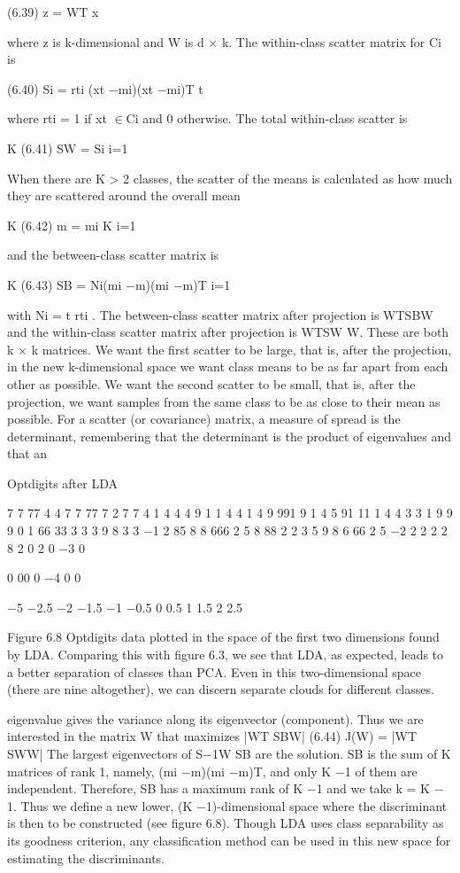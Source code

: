 (6.39) z = WT x

where z is k-dimensional and W is d $\times$ k. The within-class scatter matrix for Ci is

(6.40) Si = rti (xt $-$mi)(xt $-$mi)T t

where rti = 1 if xt $\in$Ci and 0 otherwise. The total within-class scatter is

K (6.41) SW = Si i=1

When there are K > 2 classes, the scatter of the means is calculated as how much they are scattered around the overall mean

K (6.42) m = mi K i=1

and the between-class scatter matrix is

K (6.43) SB = Ni(mi $-$m)(mi $-$m)T i=1

with Ni = t rti . The between-class scatter matrix after projection is WTSBW and the within-class scatter matrix after projection is WTSW W. These are both k $\times$ k matrices. We want the first scatter to be large, that is, after the projection, in the new k-dimensional space we want class means to be as far apart from each other as possible. We want the second scatter to be small, that is, after the projection, we want samples from the same class to be as close to their mean as possible. For a scatter (or covariance) matrix, a measure of spread is the determinant, remembering that the determinant is the product of eigenvalues and that an

Optdigits after LDA

7 7 77 4 4 7 7 77 7 2 7 7 4 1 4 4 4 9 1 1 4 4 1 4 9 991 9 1 4 5 91 11 1 4 4 3 3 1 9 9 9 0 1 66 33 3 3 3 9 8 3 3 $-$1 2 85 8 8 666 2 5 8 88 2 2 3 5 9 8 6 66 2 5 $-$2 2 2 2 2 8 2 0 2 0 $-$3 0

0 00 0 $-$4 0 0

$-$5 $-$2.5 $-$2 $-$1.5 $-$1 $-$0.5 0 0.5 1 1.5 2 2.5

Figure 6.8 Optdigits data plotted in the space of the first two dimensions found by LDA. Comparing this with figure 6.3, we see that LDA, as expected, leads to a better separation of classes than PCA. Even in this two-dimensional space (there are nine altogether), we can discern separate clouds for different classes.

eigenvalue gives the variance along its eigenvector (component). Thus we are interested in the matrix W that maximizes |WT SBW| (6.44) J(W) = |WT SWW| The largest eigenvectors of S$-$1W SB are the solution. SB is the sum of K matrices of rank 1, namely, (mi $-$m)(mi $-$m)T, and only K $-$1 of them are independent. Therefore, SB has a maximum rank of K $-$1 and we take k = K $-$1. Thus we define a new lower, (K $-$1)-dimensional space where the discriminant is then to be constructed (see figure 6.8). Though LDA uses class separability as its goodness criterion, any classification method can be used in this new space for estimating the discriminants.

